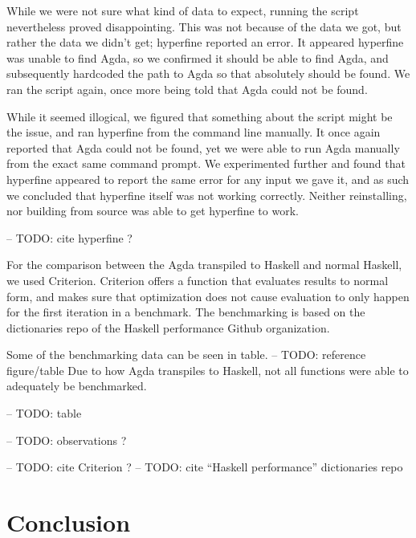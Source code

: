 \documentclass[a4paper,UKenglish,cleveref, autoref, thm-restate]{template/lipics-v2021}
\begin{document}
While we were not sure what kind of data to expect, running the script nevertheless proved disappointing. This was not because of the data we got, but rather the data we didn't get; hyperfine reported an error. It appeared hyperfine was unable to find Agda, so we confirmed it should be able to find Agda, and subsequently hardcoded the path to Agda so that absolutely should be found. We ran the script again, once more being told that Agda could not be found.\newline

While it seemed illogical, we figured that something about the script might be the issue, and ran hyperfine from the command line manually. It once again reported that Agda could not be found, yet we were able to run Agda manually from the exact same command prompt. We experimented further and found that hyperfine appeared to report the same error for any input we gave it, and as such we concluded that hyperfine itself was not working correctly. Neither reinstalling, nor building from source was able to get hyperfine to work.
 
 -- TODO: cite hyperfine ?
 
For the comparison between the Agda transpiled to Haskell and normal Haskell, we used Criterion. Criterion offers a function that evaluates results to normal form, and makes sure that optimization does not cause evaluation to only happen for the first iteration in a benchmark. The benchmarking is based on the dictionaries repo of the Haskell performance Github organization.

Some of the benchmarking data can be seen in table. -- TODO: reference figure/table
Due to how Agda transpiles to Haskell, not all functions were able to adequately be benchmarked.
 
 -- TODO: table
 
 -- TODO: observations ?
 
 -- TODO: cite Criterion ?
 -- TODO: cite ``Haskell performance'' dictionaries repo


\section{Conclusion}





\end{document}
